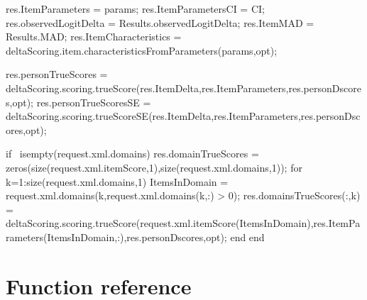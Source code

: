 \documentclass[12pt]{scrartcl}
\begin{document}
res.ItemParameters = params;
res.ItemParametersCI = CI;
res.observedLogitDelta = Results.observedLogitDelta;
res.ItemMAD = Results.MAD;
res.ItemCharacteristics = deltaScoring.item.characteristicsFromParameters(params,opt);

res.personTrueScores = deltaScoring.scoring.trueScore(res.ItemDelta,res.ItemParameters,res.personDscores,opt);
res.personTrueScoresSE = deltaScoring.scoring.trueScoreSE(res.ItemDelta,res.ItemParameters,res.personDscores,opt);

if ~isempty(request.xml.domains)
   res.domainTrueScores = zeros(size(request.xml.itemScore,1),size(request.xml.domains,1));
    for k=1:size(request.xml.domains,1)
        ItemsInDomain = request.xml.domains(k,request.xml.domains(k,:) > 0);
        res.domainsTrueScores(:,k) = deltaScoring.scoring.trueScore(request.xml.itemScore(ItemsInDomain),res.ItemParameters(ItemsInDomain,:),res.personDscores,opt);
    end
end

\section{Function reference}
\end{document}
